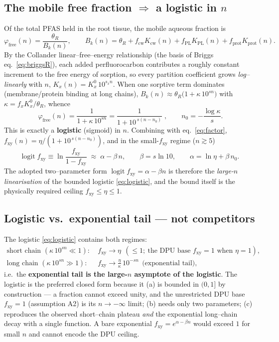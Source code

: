 \documentclass[11pt]{article}
\newcommand{\fxy}{\ensuremath{f_{\mathrm{xy}}}}
\newcommand{\Kcw}{\ensuremath{K_{\mathrm{cw}}}}
\newcommand{\Bk}{\ensuremath{B_{k}}}
\newcommand{\ffree}{\ensuremath{\varphi_{\mathrm{free}}}}
\begin{document}
\subsection{The mobile free fraction $\Rightarrow$ a logistic in $n$}
Of the total PFAS held in the root tissue, the mobile aqueous fraction is
\begin{equation}\label{eq:phifree}
\ffree(n)=\frac{\theta_R}{\Bk(n)},\qquad
\Bk(n)=\theta_R+f_{\mathrm{cw}}\Kcw(n)+f_{\mathrm{PL}}K_{\mathrm{PL}}(n)+f_{\mathrm{prot}}K_{\mathrm{prot}}(n).
\end{equation}
By the Collander linear--free--energy relationship (the basis of Briggs eq.~\ref{eq:briggsR}), each
added perfluorocarbon contributes a roughly constant increment to the free energy of sorption, so
every partition coefficient grows \emph{log--linearly} with $n$, $K_x(n)=K_x^{0}\,10^{s_x n}$. When
one sorptive term dominates (membrane/protein binding at long chains),
$\Bk(n)\approx\theta_R\bigl(1+\kappa\,10^{s n}\bigr)$ with $\kappa=f_xK_x^{0}/\theta_R$, whence
\begin{equation}\label{eq:logistic}
\boxed{\;\ffree(n)=\frac{1}{1+\kappa\,10^{s n}}=\frac{1}{1+10^{\,s(n-n_0)}}\;},
\qquad n_0=-\frac{\log\kappa}{s}.
\end{equation}
This is exactly a \textbf{logistic} (sigmoid) in $n$. Combining with eq.~\eqref{eq:factor},
$\fxy(n)=\eta/\!\left(1+10^{\,s(n-n_0)}\right)$, and in the small-$\fxy$ regime ($n\gtrsim5$)
\begin{equation}\label{eq:logit}
\operatorname{logit}\fxy \equiv \ln\frac{\fxy}{1-\fxy}\;\approx\;\alpha-\beta\,n,
\qquad \beta=s\ln 10,\qquad \alpha=\ln\eta+\beta\,n_0 .
\end{equation}
The adopted two--parameter form $\operatorname{logit}\fxy=\alpha-\beta n$ is therefore the
\emph{large-$n$ linearisation} of the bounded logistic \eqref{eq:logistic}, and the bound itself
is the physically required ceiling $\fxy\le\eta\le1$.

\subsection{Logistic vs.\ exponential tail --- not competitors}
The logistic \eqref{eq:logistic} contains both regimes:
\[
\begin{aligned}
\text{short chain }(\kappa\,10^{sn}\!\ll\!1):&\quad \fxy\to\eta\ \ (\le1;\ \text{the DPU base }\fxy{=}1\text{ when }\eta{=}1),\\[2pt]
\text{long chain }(\kappa\,10^{sn}\!\gg\!1):&\quad \fxy\to\frac{\eta}{\kappa}\,10^{-sn}\ \ \text{(exponential tail)},
\end{aligned}
\]
i.e.\ the \textbf{exponential tail is the large-$n$ asymptote of the logistic}. The logistic is the
preferred closed form because it (a) is bounded in $(0,1]$ by construction --- a fraction cannot
exceed unity, and the unrestricted DPU base $\fxy=1$ (assumption A2) is its $n\to-\infty$ limit;
(b) needs only two parameters; (c) reproduces the observed short--chain plateau \emph{and} the
exponential long--chain decay with a single function. A bare exponential $\fxy=e^{\alpha-\beta n}$
would exceed $1$ for small $n$ and cannot encode the DPU ceiling.
\end{document}
